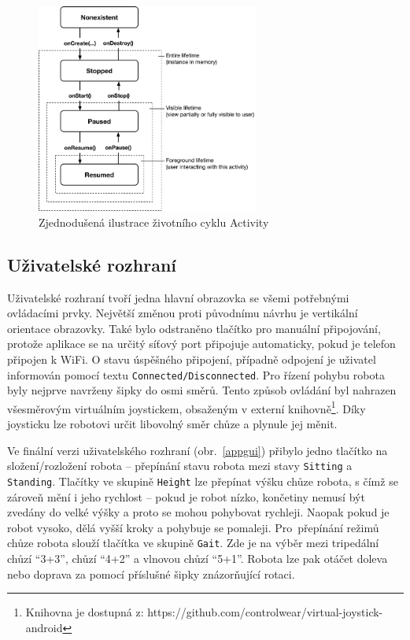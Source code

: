\begin{figure}[hbt]
	\centering
	\includegraphics[width=0.65\textwidth]{obrazky-figures/activity_lifecycle.png}
	\caption[activity]{Zjednodušená ilustrace životního cyklu Activity\footnotemark}
	\label{activity}
\end{figure}


\subsection*{Uživatelské rozhraní}
Uživatelské rozhraní tvoří jedna hlavní obrazovka se všemi potřebnými ovládacími prvky. Největší změnou proti původnímu návrhu je vertikální orientace obrazovky. Také bylo odstraněno tlačítko pro manuální připojování, protože aplikace se na určitý síťový port připojuje automaticky, pokud je telefon připojen k WiFi. O stavu úspěšného připojení, případně odpojení je uživatel informován pomocí textu \texttt{Connected/Disconnected}. Pro řízení pohybu robota byly nejprve navrženy šipky do osmi směrů. Tento způsob ovládání byl nahrazen všesměrovým virtuálním joystickem, obsaženým v externí knihovně\footnote{Knihovna je dostupná z: https://github.com/controlwear/virtual-joystick-android}. Díky joysticku lze robotovi určit libovolný směr chůze a plynule jej měnit.

Ve finální verzi uživatelského rozhraní (obr.~\ref{appgui}) přibylo jedno tlačítko na složení/rozložení robota -- přepínání stavu robota mezi stavy \texttt{Sitting} a \texttt{Standing}. Tlačítky ve skupině \texttt{Height} lze přepínat výšku chůze robota, s čímž se zároveň mění i jeho rychlost -- pokud je robot nízko, končetiny nemusí být zvedány do velké výšky a proto se mohou pohybovat rychleji. Naopak pokud je robot vysoko, dělá vyšší kroky a pohybuje se pomaleji. Pro~přepínání režimů chůze robota slouží tlačítka ve skupině \texttt{Gait}. Zde je na výběr mezi tripedální chůzí ``3+3'', chůzí ``4+2'' a vlnovou chůzí ``5+1''. Robota lze pak otáčet doleva nebo doprava za pomocí příslušné šipky znázorňující rotaci.

